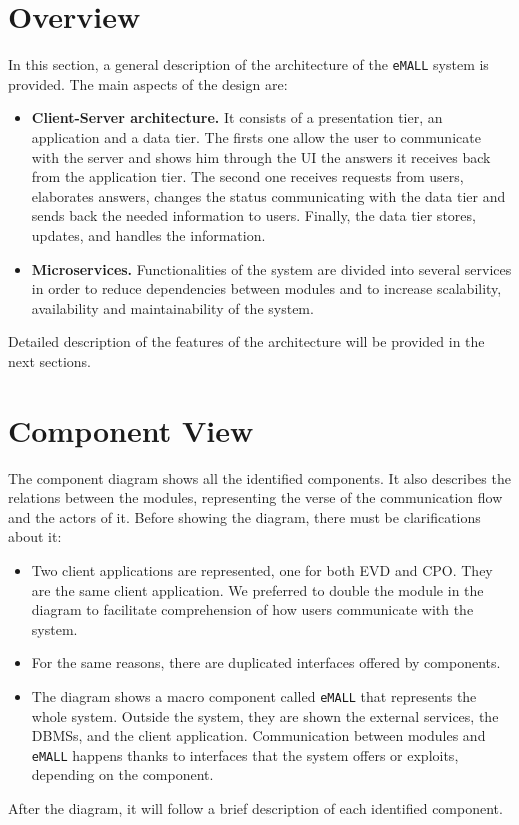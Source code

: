 \section{Overview}
\label{sec: overview}%
In this section, a general description of the architecture of the \verb|eMALL| system is provided.
The main aspects of the design are:
\begin{itemize}
    \item \textbf{Client-Server architecture. } It consists of a presentation tier, an application and a data tier.
    The firsts one allow the user to communicate with the server and shows him through the UI the answers it receives back from the application tier.
    The second one receives requests from users, elaborates answers, changes the status communicating with the data tier and sends back the needed information to users.
    Finally, the data tier stores, updates, and handles the information.
    \item \textbf{Microservices. } Functionalities of the system are divided into several services in order to reduce dependencies between
    modules and to increase scalability, availability and maintainability of the system.
\end{itemize}
Detailed description of the features of the architecture will be provided in the next sections.

\newpage


\section{Component View}
\label{sec: component_view}%
The component diagram shows all the identified components.
It also describes the relations between the modules, representing the verse of the communication flow and the actors of it.
Before showing the diagram, there must be clarifications about it:
\begin{itemize}
    \item Two client applications are represented, one for both EVD and CPO. They are the same client application.
    We preferred to double the module in the diagram to facilitate comprehension of how users communicate with the system.
    \item For the same reasons, there are duplicated interfaces offered by components.
    \item The diagram shows a macro component called \verb|eMALL| that represents the whole system.
    Outside the system, they are shown the external services, the DBMSs, and the client application.
    Communication between modules and \verb|eMALL| happens thanks to interfaces that the system offers or exploits, depending on the component.
\end{itemize}
After the diagram, it will follow a brief description of each identified component.

